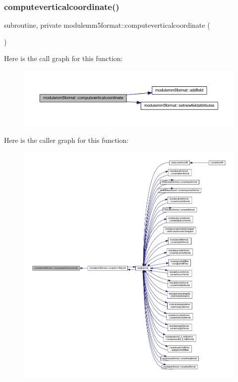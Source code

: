 \subsubsection{\texorpdfstring{computeverticalcoordinate()}{computeverticalcoordinate()}}
{\footnotesize\ttfamily subroutine, private modulemm5format\+::computeverticalcoordinate (\begin{DoxyParamCaption}{ }\end{DoxyParamCaption})\hspace{0.3cm}{\ttfamily [private]}}

Here is the call graph for this function\+:\nopagebreak
\begin{figure}[H]
\begin{center}
\leavevmode
\includegraphics[width=350pt]{namespacemodulemm5format_a904f7716ce2118cfd1236ab57b46a0f3_cgraph}
\end{center}
\end{figure}
Here is the caller graph for this function\+:\nopagebreak
\begin{figure}[H]
\begin{center}
\leavevmode
\includegraphics[width=350pt]{namespacemodulemm5format_a904f7716ce2118cfd1236ab57b46a0f3_icgraph}
\end{center}
\end{figure}
\mbox{\label{namespacemodulemm5format_a9b2d602cf6fbd9095b5738722bd3a13c}} 
